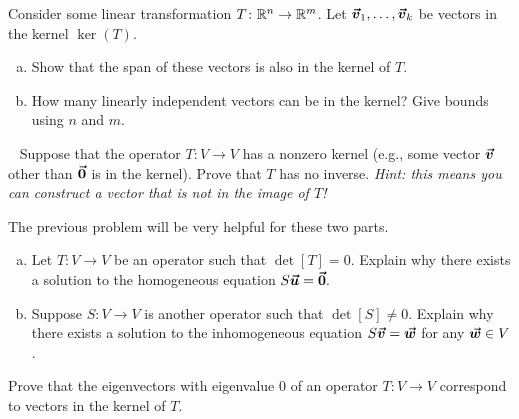 \documentclass[12pt]{article} %
\begin{document}
\begin{problem}
Consider some linear transformation $T\colon \mathbb{R}^n \to \mathbb{R}^m$.  Let $\boldsymbol{\vec{v}}_1, \dots, \boldsymbol{\vec{v}}_k$ be vectors in the kernel $\ker(T)$.
\begin{enumerate}[(a)]
    \item Show that the span of these vectors is also in the kernel of $T$.
    \item How many linearly independent vectors can be in the kernel? Give bounds using $n$ and $m$.
\end{enumerate}
\end{problem}

\begin{problem}~
    Suppose that the operator $T\colon V \to V$ has a nonzero kernel (e.g., some vector $\boldsymbol{\vec{v}}$ other than $\boldsymbol{\vec{0}}$ is in the kernel). Prove that $T$ has no inverse. \emph{Hint: this means you can construct a vector that is not in the image of $T$!}
\end{problem}

\begin{problem}
The previous problem will be very helpful for these two parts.
\begin{enumerate}[(a)]
    \item Let $T\colon V\to V$ be an operator such that $\det [T]=0$. Explain why there exists a solution to the homogeneous equation $S\boldsymbol{\vec{u}} = \boldsymbol{\vec{0}}.$
    \item Suppose $S\colon V \to V$ is another operator such that $\det [S] \neq 0$. Explain why there exists a solution to the inhomogeneous equation $S\boldsymbol{\vec{v}} = \boldsymbol{\vec{w}}$ for any $\boldsymbol{\vec{w}} \in V$.
\end{enumerate}
\end{problem}

\begin{problem}
Prove that the eigenvectors with eigenvalue 0 of an operator $T\colon V \to V$ correspond to vectors in the kernel of $T$.
\end{problem}
\end{document}
